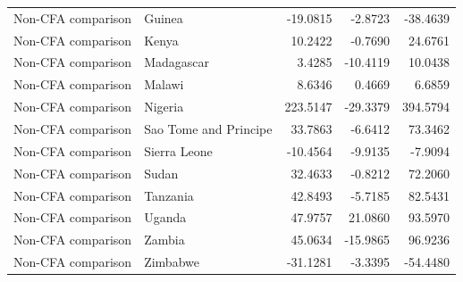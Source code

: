 \begin{table}
\begin{tabular}[t]{llrrr}
Non-CFA comparison & Guinea & -19.0815 & -2.8723 & -38.4639\\
Non-CFA comparison & Kenya & 10.2422 & -0.7690 & 24.6761\\
\addlinespace
Non-CFA comparison & Madagascar & 3.4285 & -10.4119 & 10.0438\\
Non-CFA comparison & Malawi & 8.6346 & 0.4669 & 6.6859\\
Non-CFA comparison & Nigeria & 223.5147 & -29.3379 & 394.5794\\
Non-CFA comparison & Sao Tome and Principe & 33.7863 & -6.6412 & 73.3462\\
Non-CFA comparison & Sierra Leone & -10.4564 & -9.9135 & -7.9094\\
\addlinespace
Non-CFA comparison & Sudan & 32.4633 & -0.8212 & 72.2060\\
Non-CFA comparison & Tanzania & 42.8493 & -5.7185 & 82.5431\\
Non-CFA comparison & Uganda & 47.9757 & 21.0860 & 93.5970\\
Non-CFA comparison & Zambia & 45.0634 & -15.9865 & 96.9236\\
Non-CFA comparison & Zimbabwe & -31.1281 & -3.3395 & -54.4480\\
\bottomrule
\end{tabular}
\end{table}